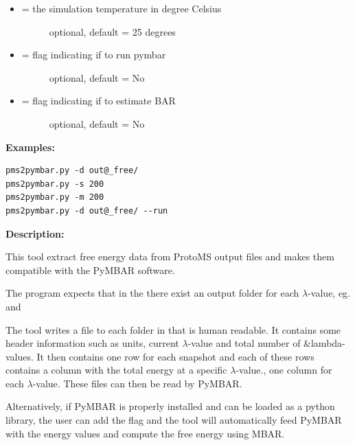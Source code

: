 \documentclass[letterpaper,10pt,english]{manual}
\begin{document}
\begin{itemize}
\begin{description}
\end{description}

\item {} \begin{description}
\item[{ = the simulation temperature in degree Celsius}] \leavevmode
optional, default = 25 degrees

\end{description}

\item {} \begin{description}
\item[{ = flag indicating if to run pymbar}] \leavevmode
optional, default = No

\end{description}

\item {} \begin{description}
\item[{ = flag indicating if to estimate BAR}] \leavevmode
optional, default = No

\end{description}

\end{itemize}

\textbf{Examples:}

\begin{Verbatim}[commandchars=@\[\]]
pms2pymbar.py -d out@_free/
pms2pymbar.py -s 200
pms2pymbar.py -m 200
pms2pymbar.py -d out@_free/ --run
\end{Verbatim}

\textbf{Description:}

This tool extract free energy data from ProtoMS output files and makes them compatible with the PyMBAR software.

The program expects that in the  there exist an output folder for each $\lambda$-value, eg.  and 

The tool writes a file  to each folder in  that is human readable. It contains some header information such as units, current $\lambda$-value and total number of \&lambda-values. It then contains one row for each snapshot and each of these rows contains a column with the total energy at a specific $\lambda$-value., one column for each $\lambda$-value. These files can then be read by PyMBAR.

Alternatively, if PyMBAR is properly installed and can be loaded as a python library, the user can add the  flag and the tool will automatically feed PyMBAR with the energy values and compute the free energy using MBAR.
\end{document}
